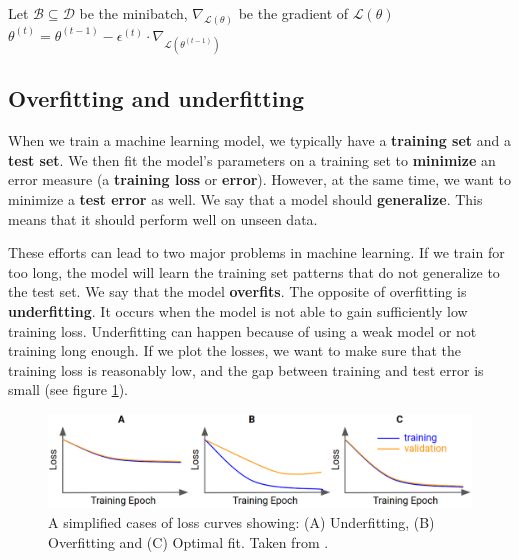 Let $\mathcal{B} \subseteq \mathcal{D}$ be
the minibatch, $\nabla_\mathcal{L(\theta)}$ be the gradient of
$\mathcal{L(\theta)}$
$
    \theta^{(t)} = \theta^{(t-1)} - \epsilon^{(t)} \cdot \nabla_{\mathcal{L}
        (\theta^{(t-1)})}
$

\subsection{Overfitting and underfitting}

When we train a machine learning model, we typically have a
\textbf{training set} and a \textbf{test set}. We then fit the model's
parameters on a training set to \textbf{minimize} an error measure
(a \textbf{training loss} or \textbf{error}). However, at the same time, we want
to minimize a \textbf{test error} as well. We say that a model should
\textbf{generalize}. This means that it should perform well on unseen data.

These efforts can lead to two major problems in machine learning. If we train
for too long, the model will learn the training set patterns that do not
generalize to the test set. We say that the model \textbf{overfits}. The
opposite of overfitting is \textbf{underfitting}. It occurs when the model is
not able to gain sufficiently low training loss. Underfitting can happen because
of using a weak model or not training long enough. If we plot the losses, we
want to make sure that the training loss is reasonably low, and the gap between
training and test error is small (see figure \ref{fig:loss_plot}).

\begin{figure}[h]
    \centering
    \includegraphics[width=\linewidth]{Sources/Figures/fitting.png}
    \caption{A simplified cases of loss curves \protect\footnotemark showing:
        (A) Underfitting, (B) Overfitting and (C) Optimal fit. Taken from
        \cite{bileschi2020deep}.}
    \label{fig:loss_plot}
\end{figure}


